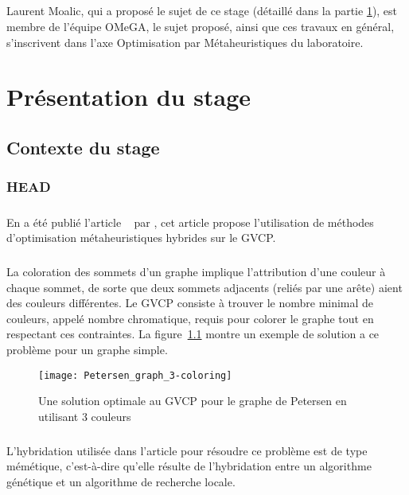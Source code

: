 \documentclass[a4paper,11pt,twoside,french,report]{../common/simplem}
\begin{document}
				\paragraph*{}
					Laurent Moalic, qui a proposé le sujet de ce stage (détaillé dans la partie \ref{sec:presentation_stage}), est membre de l'équipe \gls{OMeGA}, le sujet proposé, ainsi que ces travaux en général, s'inscrivent dans l'axe Optimisation par Métaheuristiques du laboratoire.
	\chapter{Présentation du stage}\label{sec:presentation_stage}
		\section{Contexte du stage}
			\subsection{\acrshort{HEAD}}\label{sec:head}
				\paragraph*{}
					En \citeyear{Moalic2018} a été publié l'article ~\cite{Moalic2018} par \citeauthor{Moalic2018}, cet article propose l'utilisation de méthodes d'optimisation métaheuristiques hybrides sur le \gls{GVCP}.
				\paragraph*{}
					La coloration des sommets d'un graphe implique l'attribution d'une couleur à chaque sommet, de sorte que deux sommets adjacents (reliés par une arête) aient des couleurs différentes. Le \gls{GVCP} consiste à trouver le nombre minimal de couleurs, appelé nombre chromatique, requis pour colorer le graphe tout en respectant ces contraintes. La figure~\ref{fig:Petersen_graph_3-coloring} montre un exemple de solution a ce problème pour un graphe simple.
					\begin{figure}[H]
						\centering%
						\texttt{[image: Petersen\_graph\_3-coloring]}%
						\caption{Une solution optimale au \acrshort{GVCP} pour le graphe de Petersen en utilisant 3 couleurs~\cite{wiki:Graphe_de_Petersen}}%
						\label{fig:Petersen_graph_3-coloring}%
					\end{figure}
				\paragraph*{}
					L'hybridation utilisée dans l'article pour résoudre ce problème est de type mémétique, c'est-à-dire qu'elle résulte de l'hybridation entre un algorithme génétique et un algorithme de recherche locale.
\end{document}
